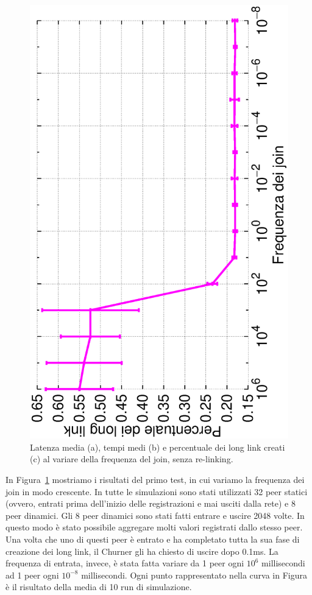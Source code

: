 \documentclass[prodmode,acmtap]{acmlarge}
\begin{document}
\begin{figure}
	\includegraphics[scale=.22, angle=-90]{imgs/norelink-freq-percLongLinks.eps}
\endminipage\hfill
\caption{Latenza media (a), tempi medi (b) e percentuale dei long link creati (c) al variare della frequenza del join, senza re-linking.}
\label{img:stabilita}
\end{figure}

In Figura~\ref{img:stabilita} mostriamo i risultati del primo test, in cui variamo la frequenza dei join in modo crescente.
In tutte le simulazioni sono stati utilizzati 32 peer statici (ovvero, entrati prima dell'inizio delle registrazioni e mai usciti dalla rete) e 8 peer dinamici. Gli 8 peer dinamici sono stati fatti entrare e uscire 2048 volte. In questo modo è stato possibile aggregare molti valori registrati dallo stesso peer. Una volta che uno di questi peer è entrato e ha completato tutta la sua fase di creazione dei long link, il Churner gli ha chiesto di uscire dopo 0.1ms. La frequenza di entrata, invece, è stata fatta variare da 1 peer ogni $10^6$ millisecondi ad 1 peer ogni $10^{-8}$ millisecondi. Ogni punto rappresentato nella curva in Figura è il risultato della media di 10 run di simulazione.
\end{document}
